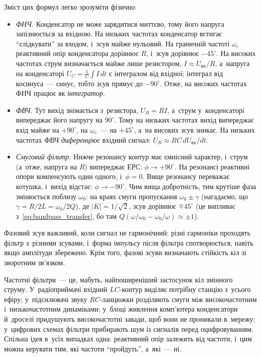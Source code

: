 Зміст цих формул легко зрозуміти фізично:

\begin{itemize}
	\item \emph{ФНЧ.} Конденсатор не може зарядитися миттєво, тому його напруга запізнюється за вхідною. На низьких частотах конденсатор встигає \enquote{слідкувати} за входом, і~зсув майже нульовий. На граничній частоті $\omega_c$ реактивний опір конденсатора дорівнює $R$, і~зсув дорівнює $-45^\circ$. На високих частотах струм визначається майже лише резистором, $I \approx U_{\text{вх}}/R$, а~напруга на конденсаторі $U_C = \frac1C\int I\,dt$ є інтегралом від вхідної; інтеграл від косинуса~--- синус, тобто зсув прямує до $-90^\circ$. Отже, на високих частотах ФНЧ працює як \emph{інтегратор}.

	\item \emph{ФВЧ.} Тут вихід знімається з~резистора, $U_R = RI$, а~струм у~конденсаторі випереджає його напругу на $90^\circ$. Тому на низьких частотах вихід випереджає вхід майже на $+90^\circ$, на $\omega_c$~--- на $+45^\circ$, а~на високих зсув зникає. На низьких частотах ФВЧ \emph{диференціює} вхідний сигнал: $U_R \approx RC\,dU_{\text{вх}}/dt$.

	\item \emph{Смуговий фільтр.} Нижче резонансу контур має ємнісний характер, і~струм (а~отже, напруга на $R$) випереджає ЕРС: $\phi \to +90^\circ$. На резонансі реактивні опори компенсують один одного, і~$\phi = 0$. Вище резонансу переважає котушка, і~вихід відстає: $\phi \to -90^\circ$. Чим вища добротність, тим крутіше фаза змінюється поблизу $\omega_0$: на краях смуги пропускання $\omega_0 \pm \gamma$ (нагадаємо, що $\gamma = R/2L = \omega_0/2Q$), де $|K| = 1/\sqrt2$, зсув дорівнює $\mp 45^\circ$ (це випливає з~\eqref{eq:bandpass_transfer}, бо там $Q(\omega/\omega_0 - \omega_0/\omega) \approx \pm 1$).
\end{itemize}

Фазовий зсув важливий, коли сигнал не гармонічний: різні гармоніки проходять фільтр з~різними зсувами, і~форма імпульсу після фільтра спотворюється, навіть якщо амплітуди збережено. Крім того, фазові зсуви визначають стійкість кіл зі зворотним зв'язком.

Частотні фільтри~--- це, мабуть, найпоширеніший застосунок кіл змінного струму. У~радіоприймачі вхідний $LC$-контур виділяє потрібну станцію з~усього ефіру; у~підсилювачі звуку $RC$-ланцюжки розділяють смуги між високочастотним і~низькочастотним динаміками; у~блоці живлення комп'ютера конденсатори й~дроселі придушують високочастотні завади, щоб вони не проникали в~мережу; у~цифрових схемах фільтри прибирають шум із сигналів перед оцифровуванням. Спільна ідея в~усіх випадках одна: реактивний опір залежить від частоти, і~цим можна керувати тим, які частоти \enquote{пройдуть}, а~які~--- ні.


